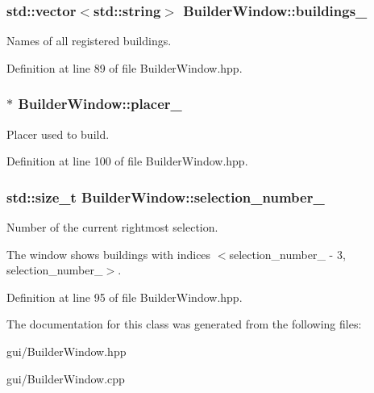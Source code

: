 \subsubsection[{\texorpdfstring{buildings\+\_\+}{buildings_}}]{\setlength{\rightskip}{0pt plus 5cm}std\+::vector$<$std\+::string$>$ Builder\+Window\+::buildings\+\_\+\hspace{0.3cm}{\ttfamily [private]}}\hypertarget{class_builder_window_a9ca2c3d5feabdea04f1f17251dd7049b}{}\label{class_builder_window_a9ca2c3d5feabdea04f1f17251dd7049b}


Names of all registered buildings. 



Definition at line 89 of file Builder\+Window.\+hpp.

\subsubsection[{\texorpdfstring{placer\+\_\+}{placer_}}]{$\ast$ Builder\+Window\+::placer\+\_\+\hspace{0.3cm}{\ttfamily [private]}}\hypertarget{class_builder_window_ac2eee6525635c8b108b48a3a7d382d82}{}\label{class_builder_window_ac2eee6525635c8b108b48a3a7d382d82}


Placer used to build. 



Definition at line 100 of file Builder\+Window.\+hpp.

\subsubsection[{\texorpdfstring{selection\+\_\+number\+\_\+}{selection_number_}}]{\setlength{\rightskip}{0pt plus 5cm}std\+::size\+\_\+t Builder\+Window\+::selection\+\_\+number\+\_\+\hspace{0.3cm}{\ttfamily [private]}}\hypertarget{class_builder_window_a5b5d32587a7434ba28856d98ea5b99de}{}\label{class_builder_window_a5b5d32587a7434ba28856d98ea5b99de}


Number of the current rightmost selection. 

The window shows buildings with indices $<$selection\+\_\+number\+\_\+ -\/ 3, selection\+\_\+number\+\_\+$>$. 

Definition at line 95 of file Builder\+Window.\+hpp.



The documentation for this class was generated from the following files\+:\begin{DoxyCompactItemize}
\item 
gui/Builder\+Window.\+hpp\item 
gui/Builder\+Window.\+cpp\end{DoxyCompactItemize}
